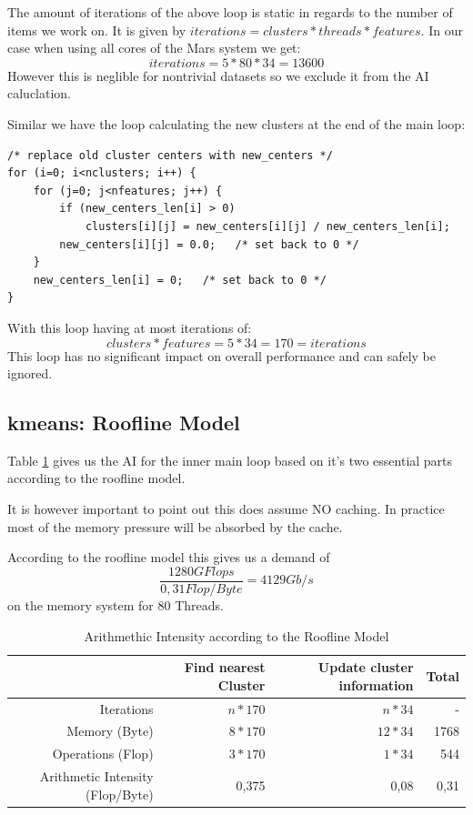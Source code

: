 The amount of iterations of the above loop is static in regards to the number of items we work on.
It is given by $ iterations = clusters * threads * features$.
In our case when using all cores of the Mars system we get: 
$$ iterations = 5 * 80  * 34 = 13600$$
However this is neglible for nontrivial datasets so we exclude it from the AI caluclation.

Similar we have the loop calculating the new clusters at the end of the main loop:
\begin{lstlisting}[caption={Reduction pt2}]
/* replace old cluster centers with new_centers */
for (i=0; i<nclusters; i++) {
	for (j=0; j<nfeatures; j++) {
		if (new_centers_len[i] > 0)
			clusters[i][j] = new_centers[i][j] / new_centers_len[i];
		new_centers[i][j] = 0.0;   /* set back to 0 */
	}
	new_centers_len[i] = 0;   /* set back to 0 */
}
\end{lstlisting}
With this loop having at most iterations of:
$$clusters * features = 5 * 34 = 170 = iterations$$ 
This loop has no significant impact on overall performance and can safely be ignored.

\subsection{kmeans: Roofline Model}

Table \ref{tab:AI} gives us the AI for the inner main loop based on it's two essential parts according to the roofline model.

It is however important to point out this does assume NO caching. In practice most of the memory pressure will be absorbed by the cache.

According to the roofline model this gives us a demand of $$\frac{1280GFlops}{0,31Flop/Byte} = 4129 Gb/s$$ on the memory system for 80 Threads.

\begin{table}[ht]
	\centering
	\caption{Arithmethic Intensity according to the Roofline Model}
	\label{tab:AI}
	\begin{tabular}{|r|r|r|r|}
		\hline
		& Find nearest Cluster & Update cluster information & Total \\ \hline
		Iterations           & $n * 170$            & $n*34$                     & -     \\ \hline
		Memory (Byte)              & $8*170$              & $12*34$                      & 1768  \\ \hline
		Operations (Flop)          & $3*170$              & $1*34$                       & 544   \\ \hline
		Arithmetic Intensity (Flop/Byte) & 0,375                & 0,08                       & 0,31  \\ \hline
	\end{tabular}
\end{table}

